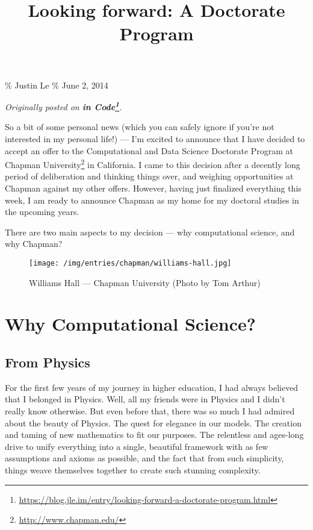 \documentclass[]{article}
\title{Looking forward: A Doctorate Program}
\renewcommand{\href}[2]{#2\footnote{\url{#1}}}
\begin{document}
\maketitle

\% Justin Le \% June 2, 2014

\emph{Originally posted on
\textbf{\href{https://blog.jle.im/entry/looking-forward-a-doctorate-program.html}{in
Code}}.}

So a bit of some personal news (which you can safely ignore if you're not
interested in my personal life!) --- I'm excited to announce that I have decided
to accept an offer to the Computational and Data Science Doctorate Program at
\href{http://www.chapman.edu/}{Chapman University} in California. I came to this
decision after a decently long period of deliberation and thinking things over,
and weighing opportunities at Chapman against my other offers. However, having
just finalized everything this week, I am ready to announce Chapman as my home
for my doctoral studies in the upcoming years.

There are two main aspects to my decision --- why computational science, and why
Chapman?

\begin{figure}
\centering
\texttt{[image: /img/entries/chapman/williams-hall.jpg]}
\caption{Williams Hall --- Chapman University (Photo by Tom Arthur)}
\end{figure}

\section{Why Computational Science?}\label{why-computational-science}

\subsection{From Physics}\label{from-physics}

For the first few years of my journey in higher education, I had always believed
that I belonged in Physics. Well, all my friends were in Physics and I didn't
really know otherwise. But even before that, there was so much I had admired
about the beauty of Physics. The quest for elegance in our models. The creation
and taming of new mathematics to fit our purposes. The relentless and ages-long
drive to unify everything into a single, beautiful framework with as few
assumptions and axioms as possible, and the fact that from such simplicity,
things weave themselves together to create such stunning complexity.
\end{document}
